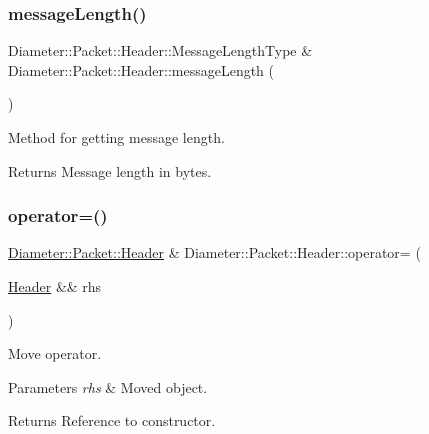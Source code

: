 \subsubsection{\texorpdfstring{message\+Length()}{messageLength()}\hspace{0.1cm}{\footnotesize\ttfamily [2/2]}}
{\footnotesize\ttfamily Diameter\+::\+Packet\+::\+Header\+::\+Message\+Length\+Type \& Diameter\+::\+Packet\+::\+Header\+::message\+Length (\begin{DoxyParamCaption}{ }\end{DoxyParamCaption})}



Method for getting message length. 

\begin{DoxyReturn}{Returns}
Message length in bytes. 
\end{DoxyReturn}
\mbox{\label{classDiameter_1_1Packet_1_1Header_ae863a0e3740a82b3418494cfa15f4530}} 
\subsubsection{\texorpdfstring{operator=()}{operator=()}\hspace{0.1cm}{\footnotesize\ttfamily [1/2]}}
{\footnotesize\ttfamily \hyperlink{classDiameter_1_1Packet_1_1Header}{Diameter\+::\+Packet\+::\+Header} \& Diameter\+::\+Packet\+::\+Header\+::operator= (\begin{DoxyParamCaption}\item[{\hyperlink{classDiameter_1_1Packet_1_1Header}{Header} \&\&}]{rhs }\end{DoxyParamCaption})\hspace{0.3cm}{\ttfamily [noexcept]}}



Move operator. 


\begin{DoxyParams}{Parameters}
{\em rhs} & Moved object. \\
\hline
\end{DoxyParams}
\begin{DoxyReturn}{Returns}
Reference to constructor. 
\end{DoxyReturn}
\mbox{\label{classDiameter_1_1Packet_1_1Header_a3dc74d805164823f4074269da9932c1b}} 
